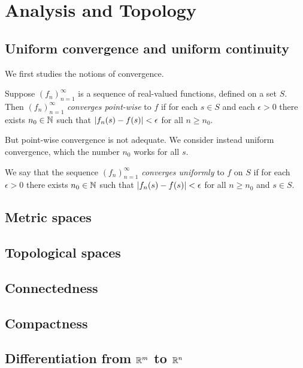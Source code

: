 \documentclass[main.tex]{subfiles}
\begin{document}
	\chapter{Analysis and Topology}
	\section{Uniform convergence and uniform continuity}
		We first studies the notions of convergence.
		\begin{definition}
			Suppose $(f_n)_{n = 1}^\infty$ is a sequence of real-valued functions, defined on a set $S$. Then $(f_n)_{n = 1}^\infty$ \textit{converges point-wise} to $f$ if for each $s \in S$ and each $\epsilon > 0$ there exists $n_0 \in \mathbb N$ such that $\lvert f_n(s) - f(s)\rvert < \epsilon$ for all $n \geq n_0$.
		\end{definition}
		But point-wise convergence is not adequate. We consider instead uniform convergence, which the number $n_0$ works for all $s$.
		
		\begin{definition}
			We say that the sequence $(f_n)_{n = 1}^\infty$ \textit{converges uniformly} to $f$ on $S$ if for each $\epsilon > 0$ there exists $n_0 \in \mathbb N$ such that $\lvert f_n(s) - f(s)\rvert < \epsilon$ for all $n \geq n_0$ and $s \in S$.
		\end{definition}
		
		
	\section{Metric spaces}
	
	\section{Topological spaces}
	
	\section{Connectedness}
	
	\section{Compactness}
	
	\section{Differentiation from $\mathbb R^m$ to $\mathbb R^n$}
	
\end{document}
